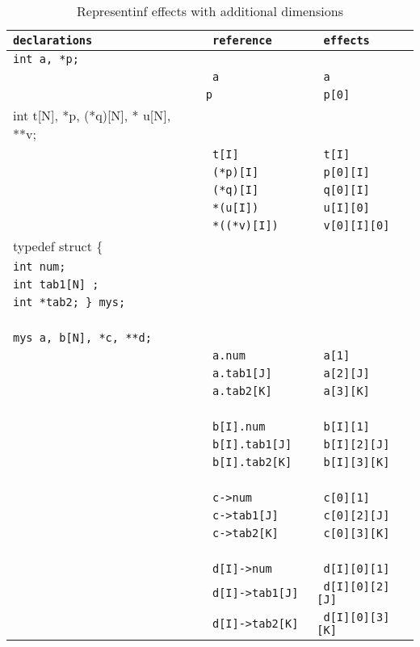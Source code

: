 \documentclass[a4paper]{report}
\begin{document}
\begin{table}[htbp]
\begin{center}
\begin{tabular}{| >{\tt}l | >{\tt}l | >{\tt}l |}

\hline
declarations & reference & effects \\ \hline

int a, *p; &   & \\
      & a & a\\
      &*p & p[0] \\\hline

int t[N], *p, (*q)[N], * u[N], **v; & & \\ 
        & t[I] & t[I] \\
        & (*p)[I]& p[0][I]\\ 
        & (*q)[I] & q[0][I] \\
        & *(u[I])& u[I][0]\\
        & *((*v)[I])& v[0][I][0]\\\hline

typedef struct \{ & & \\
int num; && \\
int tab1[N] ; && \\
int *tab2; \} mys;&& \\
&& \\

mys a, b[N], *c, **d; & & \\
                  & a.num  & a[1] \\
                  & a.tab1[J] & a[2][J] \\
                  & a.tab2[K] & a[3][K] \\
&& \\
                  & b[I].num & b[I][1] \\
                  & b[I].tab1[J] & b[I][2][J]\\
                  & b[I].tab2[K]& b[I][3][K]\\
&& \\
                  & c->num & c[0][1]\\
                  & c->tab1[J] & c[0][2][J] \\
                  & c->tab2[K] & c[0][3][K] \\
&& \\
                  & d[I]->num & d[I][0][1]\\
                  & d[I]->tab1[J] & d[I][0][2][J]\\
                  & d[I]->tab2[K] & d[I][0][3][K]\\ \hline
                  
\end{tabular}
\end{center}
\caption{Representinf effects with additional dimensions}\label{tab:effects}
\end{table}
\end{document}
